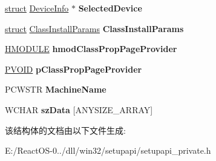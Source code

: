 \begin{DoxyCompactItemize}
\hyperlink{interfacestruct}{struct} \hyperlink{struct_device_info}{Device\+Info} $\ast$ {\bfseries Selected\+Device}
\item 
\mbox{\label{struct_device_info_set_a41f1d11e6a0f3f97da6964b35375eefc}} 
\hyperlink{interfacestruct}{struct} \hyperlink{struct_class_install_params}{Class\+Install\+Params} {\bfseries Class\+Install\+Params}
\item 
\mbox{\label{struct_device_info_set_a5adcd4842cfb74d91886266358374166}} 
\hyperlink{interfacevoid}{H\+M\+O\+D\+U\+LE} {\bfseries hmod\+Class\+Prop\+Page\+Provider}
\item 
\mbox{\label{struct_device_info_set_a3d643454eb073fb12cce62c07c8f256c}} 
\hyperlink{interfacevoid}{P\+V\+O\+ID} {\bfseries p\+Class\+Prop\+Page\+Provider}
\item 
\mbox{\label{struct_device_info_set_a4c143fd8c50950eea52f7d1a17662f1d}} 
P\+C\+W\+S\+TR {\bfseries Machine\+Name}
\item 
\mbox{\label{struct_device_info_set_ad6ee0d22fe36f63d850faa4d47089508}} 
W\+C\+H\+AR {\bfseries sz\+Data} \mbox{[}A\+N\+Y\+S\+I\+Z\+E\+\_\+\+A\+R\+R\+AY\mbox{]}
\end{DoxyCompactItemize}


该结构体的文档由以下文件生成\+:\begin{DoxyCompactItemize}
\item 
E\+:/\+React\+O\+S-\/0../dll/win32/setupapi/setupapi\+\_\+private.\+h\end{DoxyCompactItemize}
